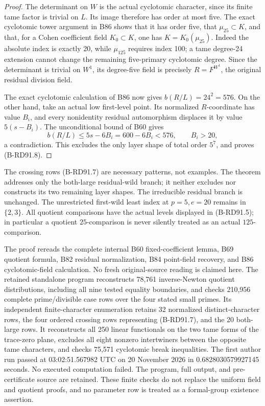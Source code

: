 \begin{proof}
The determinant on \(W\) is the actual cyclotomic character,
since its finite tame factor is trivial on \(L\). Its image
therefore has order at most five. The exact cyclotomic tower
argument in B86 shows that it has order five, that
\(\mu_{25}\subset K\), and that, for a Cohen coefficient field
\(K_0\subset K\), one has \(K=K_0(\mu_{25})\). Indeed the
absolute index is exactly 20, while \(\mu_{125}\) requires
index 100; a tame degree-24 extension cannot change the remaining
five-primary cyclotomic degree. Since the determinant is trivial
on \(W^1\), its degree-five field is precisely
\(R=F^{W^1}\), the original residual division field.

The exact cyclotomic calculation of B86 now gives
\(b(R/L)=24^2=576\). On the other hand, take an actual low
first-level point. Its normalized \(R\)-coordinate has value
\(B_i\), and every nonidentity residual automorphism displaces
it by value \(5(s-B_i)\). The unconditional bound of B60 gives
\[
             b(R/L)\le5s-6B_i=600-6B_i<576,
                        \qquad B_i>20,                \tag{B-RD91.11}
\]
a contradiction. This excludes the only layer shape of total
order \(5^7\), and proves (B-RD91.8).
\end{proof}

\begin{remark}
\label{rem:B-RD91-scope}
The crossing rows (B-RD91.7) are necessary patterns, not examples.
The theorem addresses only the both-large residual-wild branch;
it neither excludes nor constructs its two remaining layer shapes.
The irreducible residual branch is unchanged. The unrestricted
first-wild least index at \(p=5,e=20\) remains in \(\{2,3\}\).
All quotient comparisons have the actual levels displayed in
(B-RD91.5); in particular a quotient \(25\)-comparison is never
silently treated as an actual \(125\)-comparison.

The proof rereads the complete internal B60 fixed-coefficient
lemma, B69 quotient formula, B82 residual normalization, B84
point-field recovery, and B86 cyclotomic-field calculation.
No fresh original-source reading is claimed here. The retained
standalone program
reconstructs 78,761 inverse-Newton quotient distributions, including
all nine tested equality boundaries, and checks 210,956 complete
prime/divisible case rows over the four stated small primes.
Its independent finite-character enumeration retains 32 normalized
distinct-character rows, the four ordered crossing rows representing
(B-RD91.7), and the 20 both-large rows. It reconstructs all 250
linear functionals on the two tame forms of the trace-zero plane,
excludes all eight nonzero intertwiners between the opposite tame
characters, and checks 75,571 cyclotomic break inequalities.
The first author run passed at 03:02:51.567982 UTC on 20 November
2026 in 0.6828030579927145 seconds. No executed computation failed.
The program, full output, and pre-certificate source are retained.
These finite checks do not replace the uniform field and quotient
proofs, and no parameter row is treated as a formal-group existence
assertion.
\end{remark}
